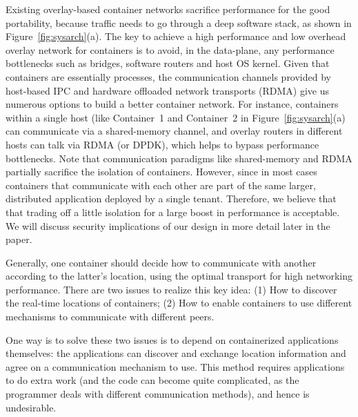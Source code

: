 Existing overlay-based container networks sacrifice performance for the good
portability, because traffic needs to go through a deep software stack, as shown
in Figure~\ref{fig:sysarch}(a).  The key to achieve a high performance and low
overhead overlay network for containers is to avoid, in the data-plane, any
performance bottlenecks such as bridges, software routers and host OS kernel.
Given that containers are essentially processes, the communication channels
provided by host-based IPC and hardware offloaded network transports (RDMA) give
us numerous options to build a better container network. For instance,
containers within a single host (like Container~1 and Container~2 in
Figure~\ref{fig:sysarch}(a) can communicate via a shared-memory channel, and
overlay routers in different hosts can talk via RDMA (or DPDK), which helps to
bypass performance bottlenecks. Note that communication paradigms like
shared-memory and RDMA partially sacrifice the isolation of containers. However,
since in most cases containers that communicate with each other are part of the
same larger, distributed application deployed by a single tenant. Therefore, we
believe that that trading off a little isolation for a large boost in
performance is acceptable.  We will discuss security implications of our design
in more detail later in the paper.


Generally, one container should decide how to communicate with another according
to the latter's location, using the optimal transport for high networking
performance.  There are two issues to realize this key idea: (1) How to discover
the real-time locations of containers; (2) How to enable containers to use
different mechanisms to communicate with different peers.

One way is to solve these two issues is to depend on containerized applications
themselves: the applications can discover and exchange location information and
agree on a communication mechanism to use. This method requires applications to
do extra work (and the code can become quite complicated, as the programmer
deals with different communication methods), and hence is undesirable. 

